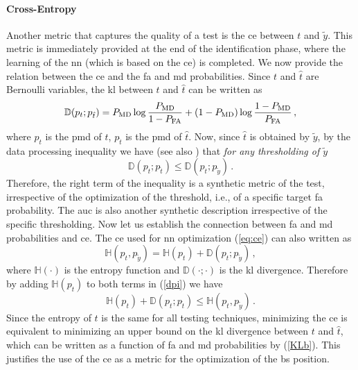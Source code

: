 \documentclass[conference]{IEEEtran}
\begin{document}
\paragraph{Cross-Entropy} Another metric that captures the quality of a test is the \ac{ce} between $t$ and $\tilde{y}$. This metric is immediately provided at the end of the identification phase, where the learning of the \ac{nn} (which is based on the \ac{ce}) is completed. We now provide the relation between the \ac{ce} and the \ac{fa} and \ac{md} probabilities. Since $t$ and $\hat{t}$ are Bernoulli variables, the \ac{kl} between $t$ and $\hat{t}$ can be written as 
\begin{equation}
\mathbb D(p_t; p_{\hat{t}}) = P_{\rm MD} \log \frac{P_{\rm MD}}{1 - P_{\rm FA}} + (1-P_{\rm MD})\log \frac{1- P_{\rm MD}}{P_{\rm FA}}\,,
\label{KLb}
\end{equation}
where $p_t$ is the \ac{pmd} of $t$, $p_{\hat{t}}$ is the \ac{pmd} of $\hat{t}$. Now, since $\hat{t}$ is obtained by $\tilde{y}$, by the data processing inequality we have (see also \cite{Tomasin-Ferrante}) that {\em for any thresholding of $\tilde{y}$}
\begin{equation}
\mathbb D(p_t; p_{\hat{t}}) \leq \mathbb D(p_t; p_{\tilde{y}})\,.
\label{dpi}
\end{equation}
Therefore, the right term of the inequality is  a synthetic metric of the test, irrespective of the optimization of the threshold, i.e., of a specific target \ac{fa} probability. The \ac{auc} is also another synthetic description irrespective of the specific thresholding. Now let us establish the connection between \ac{fa} and \ac{md} probabilities and \ac{ce}. The \ac{ce} used for \ac{nn} optimization (\ref{eq:ce})  can also written as 
\begin{equation}
\mathbb H(p_t,p_{\tilde{y}}) = \mathbb H(p_t) +\mathbb D(p_t; p_{\tilde{y}})\,,
\end{equation}
where $\mathbb H(\cdot)$ is the entropy function and $\mathbb D(\cdot;\cdot)$ is the \ac{kl} divergence. Therefore by  adding $\mathbb H(p_t)$ to both terms in (\ref{dpi}) we have 
\begin{equation}
\mathbb H(p_t) +\mathbb  D(p_t; p_{\hat{t}}) \leq \mathbb H(p_t,p_{\tilde{y}})\,. 
\end{equation}
Since the entropy of $t$ is the same for all testing techniques, minimizing the \ac{ce} is equivalent to minimizing an upper bound on the \ac{kl} divergence between $t$ and $\hat{t}$, which can be written as a function of \ac{fa} and \ac{md} probabilities by (\ref{KLb}). This justifies the use of the \ac{ce} as a metric for the optimization of the \ac{bs} position.
\end{document}
